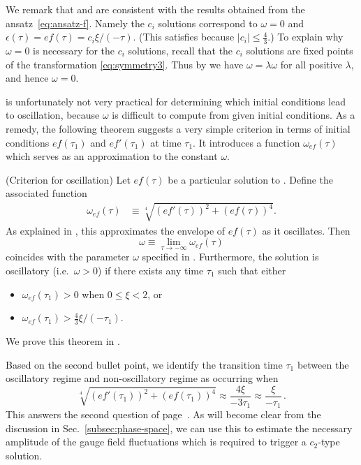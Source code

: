 We remark that  and  are consistent with the results obtained from the ansatz~\eqref{eq:ansatz-f}. Namely the $c_{i}$ solutions correspond to $\omega=0$ and $\epsilon(\tau)=ef(\tau)=c_{i}\xi/(-\tau)$. (This satisfies  because $\left|c_{i}\right|\leq\tfrac{4}{3}$.) To explain why $\omega=0$ is necessary for the $c_{i}$ solutions, recall that the $c_{i}$ solutions are fixed points of the transformation \eqref{eq:symmetry3}. Thus by  we have $\omega=\lambda\omega$ for all positive $\lambda$, and hence $\omega=0$. 

 is unfortunately not very practical for determining which initial conditions lead to oscillation, because $\omega$ is difficult to compute from given initial conditions. As a remedy, the following theorem suggests a very simple criterion in terms of initial conditions $ef(\tau_{1})$ and $ef'(\tau_{1})$ at time $\tau_{1}$. It introduces a function $\omega_{ef}(\tau)$ which serves as an approximation to the constant $\omega$. 
\begin{thm}
\label{thm:approx-w}(Criterion for oscillation) Let $ef(\tau)$ be a particular solution to . Define the associated function 
\begin{align}
\omega_{ef}(\tau) & \equiv\sqrt[4]{(ef'(\tau))^{2}+\left(ef(\tau)\right)^{4}}.\label{eq:omega_ef}
\end{align}
 As explained in , this approximates the envelope of $ef(\tau)$ as it oscillates. Then 
\[
\omega\equiv\lim_{\tau\to-\infty}\omega_{ef}(\tau)
\]
 coincides with the parameter $\omega$ specified in . Furthermore, the solution is oscillatory (i.e.\ $\omega>0$) if there exists any time $\tau_{1}$ such that either 
\begin{itemize}
\item $\omega_{ef}(\tau_{1})>0$ when $0\leq\xi<2$, or 
\item $\omega_{ef}(\tau_{1})>\tfrac{4}{3}\xi/(-\tau_{1})$. 
\end{itemize}
\end{thm}

We prove this theorem in . 

Based on the second bullet point, we identify the transition time $\tau_{1}$ between the oscillatory regime and non-oscillatory regime as occurring when 
\begin{equation}
\sqrt[4]{(ef'(\tau_{1}))^{2}+\left(ef(\tau_{1})\right)^{4}}\approx\frac{4\xi}{-3\tau_{1}}\approx\frac{\xi}{-\tau_{1}}\,.\label{eq:BoundaryOscillatory}
\end{equation}
 This answers the second question of page~\pageref{enu:central-questions}. As will become clear from the discussion in Sec.~\ref{subsec:phase-space}, we can use this to estimate the necessary amplitude of the gauge field fluctuations which is required to trigger a $c_{2}$\nobreakdash-type solution.

